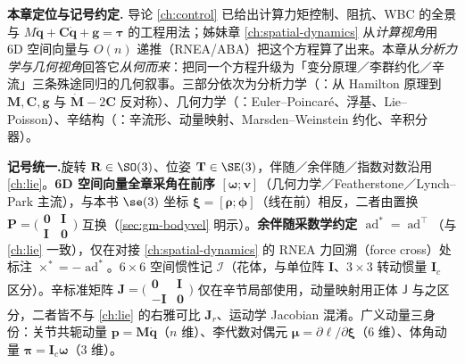 \begin{note}
\textbf{本章定位与记号约定.}\;
导论 \cref{ch:control} 已给出计算力矩控制、阻抗、WBC 的全景与 $M\ddot{\mathbf q}+\mathbf C\dot{\mathbf q}+\mathbf g=\boldsymbol\tau$ 的工程用法；姊妹章 \cref{ch:spatial-dynamics} 从\emph{计算视角}用 6D 空间向量与 $O(n)$ 递推（RNEA/ABA）把这个方程算了出来。本章从\emph{分析力学与几何视角}回答它\emph{从何而来}：把同一个方程升级为「变分原理／李群约化／辛流」三条殊途同归的几何叙事。三部分依次为分析力学（：从 Hamilton 原理到 $\mathbf M,\mathbf C,\mathbf g$ 与 $\dot{\mathbf M}-2\mathbf C$ 反对称）、几何力学（：Euler--Poincaré、浮基、Lie--Poisson）、辛结构（：辛流形、动量映射、Marsden--Weinstein 约化、辛积分器）。

\textbf{记号统一.}\;旋转 $\mathbf R\in\SO(3)$、位姿 $\mathbf T\in\SE(3)$，伴随／余伴随／指数对数沿用 \cref{ch:lie}。\textbf{6D 空间向量全章采角在前序 $[\boldsymbol\omega;\mathbf v]$}（几何力学／Featherstone／Lynch--Park 主流），与本书 $\se(3)$ 坐标 $\boldsymbol\xi=[\boldsymbol\rho;\boldsymbol\phi]$（线在前）相反，二者由置换 $\mathbf P=\bigl(\begin{smallmatrix}\mathbf 0&\mathbf I\\\mathbf I&\mathbf 0\end{smallmatrix}\bigr)$ 互换（\cref{sec:gm-bodyvel} 明示）。\textbf{余伴随采数学约定 $\operatorname{ad}^*=\operatorname{ad}^\top$}（与 \cref{ch:lie} 一致），仅在对接 \cref{ch:spatial-dynamics} 的 RNEA 力回溯（force cross）处标注 $\times^*=-\operatorname{ad}^*$。$6\times6$ 空间惯性记 $\boldsymbol{\mathcal I}$（花体，与单位阵 $\mathbf I$、$3\times3$ 转动惯量 $\mathbf I_c$ 区分）。辛标准矩阵 $\mathbf J=\bigl(\begin{smallmatrix}\mathbf 0&\mathbf I\\-\mathbf I&\mathbf 0\end{smallmatrix}\bigr)$ 仅在辛节局部使用，动量映射用正体 $\mathsf J$ 与之区分，二者皆不与 \cref{ch:lie} 的右雅可比 $\mathbf J_r$、运动学 Jacobian 混淆。广义动量三身份：关节共轭动量 $\mathbf p=\mathbf M\dot{\mathbf q}$（$n$ 维）、李代数对偶元 $\boldsymbol\mu=\partial\ell/\partial\boldsymbol\xi$（$6$ 维）、体角动量 $\boldsymbol\pi=\mathbf I_c\boldsymbol\omega$（$3$ 维）。
\end{note}

